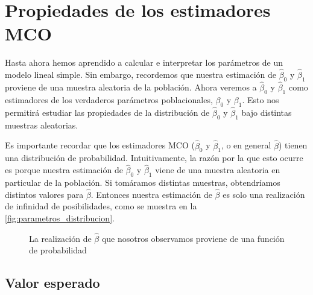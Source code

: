 \documentclass[12pt]{report}\usepackage[]{graphicx}\usepackage[]{color}
\begin{document}
\section{Propiedades de los estimadores MCO}

Hasta ahora hemos aprendido a calcular e interpretar los parámetros de un modelo lineal simple. Sin embargo, recordemos que nuestra estimación de $\hat\beta_0$ y $\hat\beta_1$ proviene de una muestra aleatoria de la población.
Ahora veremos a $\hat\beta_0$ y $\hat\beta_1$ como estimadores de los verdaderos parámetros poblacionales, $\beta_0$ y $\beta_1$.
Esto nos permitirá estudiar las propiedades de la distribución de $\hat\beta_0$ y $\hat\beta_1$ bajo distintas muestras aleatorias.

Es importante recordar que los estimadores MCO ($\hat\beta_0$ y $\hat\beta_1$, o en general $\hat\beta$) tienen una distribución de probabilidad.
Intuitivamente, la razón por la que esto ocurre es porque nuestra estimación de $\hat\beta_0$ y $\hat\beta_1$ viene de una muestra aleatoria en particular de la población.
Si tomáramos distintas muestras, obtendríamos distintos valores para $\hat\beta$.
Entonces nuestra estimación de $\hat\beta$ es solo una realización de infinidad de posibilidades, como se muestra en la \autoref{fig:parametros_distribucion}.

\begin{figure}[htb]
  \centering
  \caption{La realización de $\hat\beta$ que nosotros observamos proviene de una función de probabilidad}
  \label{fig:parametros_distribucion}
\end{figure}%

\subsection{Valor esperado}
\end{document}

